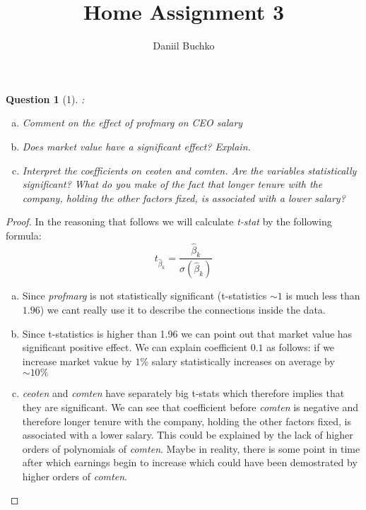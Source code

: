 \documentclass[12pt,reqno]{amsart}
\title{Home Assignment 3}
\author{Daniil Buchko}
\theoremstyle{plain}
\newtheorem*{theorem*}{Question}
\begin{document}
\maketitle
\begin{theorem*}[1]
    \normalfont
    :
    \begin{enumerate}[(a)]
        \item Comment on the effect of \textit{profmarg} on CEO salary
        \item Does market value have a significant effect? Explain.
        \item Interpret the coefficients on \textit{ceoten} and \textit{comten}. Are the variables
              statistically significant? What do you make of the fact that longer tenure with the company,
              holding the other factors fixed, is associated with a lower salary?
    \end{enumerate}
\end{theorem*}
\begin{proof}
    In the reasoning that follows we will calculate \textit{t-stat} by the following formula:
    \[
        t_{\hat\beta_{k}} = \frac{\hat\beta_k}{\sigma(\hat\beta_k)}
    \]
    \begin{enumerate}[(a)]
        \item Since \textit{profmarg} is not statistically significant (t-statistics $ \sim 1 $ is
              much less than $ 1.96 $) we cant really use it to describe the connections inside the data.
        \item Since t-statistics is higher than 1.96 we can point out that market value has significant
              positive effect. We can explain coefficient $ 0.1 $ as follows: if we increase market vakue
              by $ 1\% $ salary statistically increases on average by $ \sim 10\% $
        \item \textit{ceoten} and \textit{comten} have separately big t-stats which therefore implies
              that they are significant. We can see that coefficient before \textit{comten} is negative
              and therefore longer tenure with the company, holding the other factors fixed,
              is associated with a lower salary. This could be explained by the lack of higher orders
              of polynomials of \textit{comten}. Maybe in reality, there is some point in time after
              which earnings begin to increase which could have been demostrated by higher orders of
              \textit{comten}.
    \end{enumerate}
\end{proof}
\end{document}
